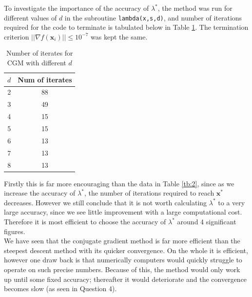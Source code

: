 \documentclass[10pt,a4paper,notitlepage]{article}
\newcommand{\abs}[1]{\lvert#1\rvert}
\newcommand{\x}{\mathbf{x}}
\begin{document}
To investigate the importance of the accuracy of $\lambda^{*}$, the method was run for different values of $d$ in the subroutine \texttt{lambda(x,s,d)}, and number of iterations required for the code to terminate is tabulated below in Table \ref{tb:10}. The termination criterion $\abs{\abs{\nabla f(\x_{i})}}\leq 10^{-7}$ was kept the same.
\begin{table}[H]
\centering
\begin{tabular}{|c|c|}
\hline $d$ & Num of iterates \\ \hline
2 & 88\\
3 & 49\\
4 & 15 \\
5 & 15\\
6 & 13\\
7 & 13\\
8 & 13 \\ \hline
\end{tabular}
\caption{Number of iterates for CGM with different $d$}\label{tb:10}
\end{table}
Firstly this is far more encouraging than the data in Table \ref{tb:2}, since as we increase the accuracy of $\lambda^{*}$, the number of iterations required to reach $\x^{*}$ decreases. However we still conclude that it is not worth calculating $\lambda^{*}$ to a very large accuracy, since we see little improvement with a large computational cost. Therefore it is most efficient to choose the accuracy of $\lambda^{*}$ around 4 significant figures. \\

We have seen that the conjugate gradient method is far more efficient than the steepest descent method with its quicker convergence. On the whole it is efficient, however one draw back is that numerically computers would quickly struggle to operate on such precise numbers. Because of this, the method would only work up until some fixed accuracy; thereafter it would deteriorate and the convergence becomes slow (as seen in Question 4).
\end{document}
